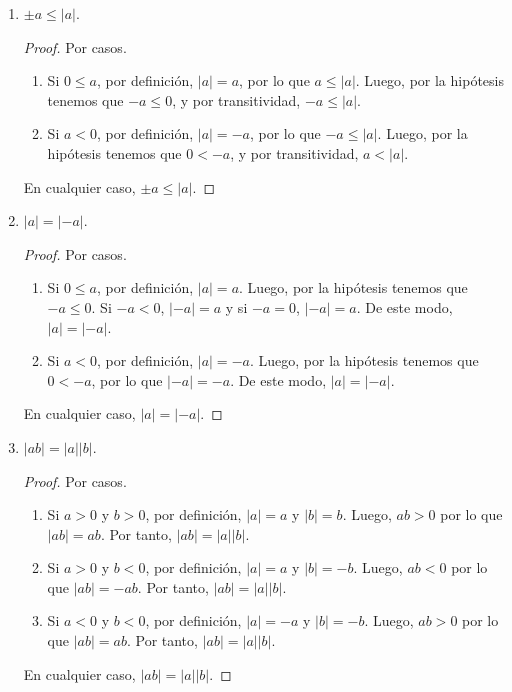 \documentclass[11pt]{article}
\begin{document}
\begin{enumerate}[label=\alph*)]
\item $\pm a\leq |a|$.

\vspace{-1em}\begin{proof}
    Por casos.
    \begin{enumerate}[label=\roman*)]
        \item Si $0 \leq a$, por definición, $|a|=a$, por lo que $a\leq |a|$. Luego, por la hipótesis tenemos que $-a \leq 0$, y por transitividad, $-a\leq |a|$.
        \item Si $a<0$, por definición, $|a|=-a$, por lo que $-a\leq |a|$. Luego, por la hipótesis tenemos que $0<-a$, y por transitividad, $a<|a|$.
    \end{enumerate}
    En cualquier caso, $\pm a\leq |a|$.
\end{proof} \vspace{-1em}    

\item $|a|=|-a|$.
\vspace{-1em}\begin{proof}
    Por casos.
    \begin{enumerate}[label=\roman*)]
        \item Si $0 \leq a$, por definición, $|a|=a$. Luego, por la hipótesis tenemos que $-a \leq 0$. Si $-a<0$, $|-a|=a$ y si $-a=0$, $|-a|=a$. De este modo, $|a|=|-a|$.
        \item Si $a<0$, por definición, $|a|=-a$. Luego, por la hipótesis tenemos que $0<-a$, por lo que $|-a|=-a$. De este modo, $|a|=|-a|$.
    \end{enumerate}
    En cualquier caso, $|a|=|-a|$.
\end{proof} \vspace{-1em}

\item $|ab|=|a||b|$.

\vspace{-1em}\begin{proof}
    Por casos.
    \begin{enumerate}[label=\roman*)]
        \item Si $a>0$ y $b>0$, por definición, $|a|=a$ y $|b|=b$. Luego, $ab>0$ por lo que $|ab|=ab$. Por tanto, $|ab| =|a||b|$.
        \item Si $a>0$ y $b<0$, por definición, $|a|=a$ y $|b|=-b$. Luego, $ab<0$ por lo que $|ab|=-ab$. Por tanto, $|  ab|=|a||b|$.
        \item Si $a<0$ y $b<0$, por definición, $|a|=-a$ y $|b|=-b$. Luego, $ab>0$ por lo que $|ab|=ab$. Por tanto, $|  ab|=|a||b|$.
    \end{enumerate}
    En cualquier caso, $|ab|=|a||b|$.
\end{proof} \vspace{-1em}


\end{enumerate}
\end{document}

